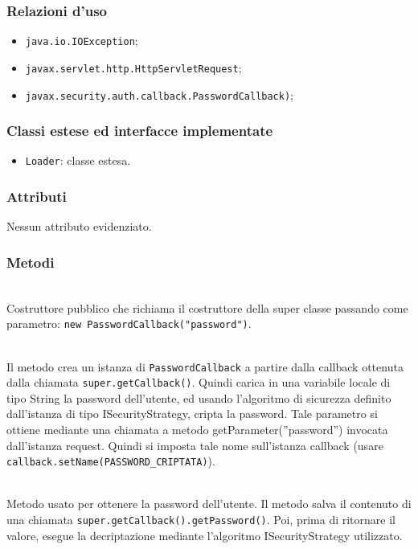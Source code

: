 \subsubsection*{Relazioni d'uso}
\begin{itemize}
	\item \texttt{java.io.IOException};
	\item \texttt{javax.servlet.http.HttpServletRequest};
	\item \texttt{javax.security.auth.callback.PasswordCallback)};
\end{itemize}

\subsubsection*{Classi estese ed interfacce implementate}

\begin{itemize}
	\item \texttt{Loader}: classe estesa.
\end{itemize}

\subsubsection*{Attributi}

Nessun attributo evidenziato.

\subsubsection*{Metodi}
\begin{description}
	\item{}\\
	Costruttore pubblico che richiama il costruttore della super classe passando come parametro: \verb|new PasswordCallback("password")|.
	
	\item{}\\
	Il metodo crea un istanza di \texttt{PasswordCallback} a partire dalla callback ottenuta dalla chiamata \verb|super.getCallback()|. Quindi carica in una variabile locale di tipo String la password dell'utente, ed usando l'algoritmo di sicurezza definito dall'istanza di tipo ISecurityStrategy, cripta la password. Tale parametro si ottiene mediante una chiamata a metodo getParameter(''password'') invocata dall'istanza request. Quindi si imposta tale nome sull'istanza callback (usare \verb|callback.setName(PASSWORD_CRIPTATA)|).
	
	\item{}\\
	Metodo usato per ottenere la password dell'utente. Il metodo salva il contenuto di una chiamata \verb|super.getCallback().getPassword()|. Poi, prima di ritornare il valore, esegue la decriptazione mediante l'algoritmo ISecurityStrategy utilizzato.
	
\end{description}

